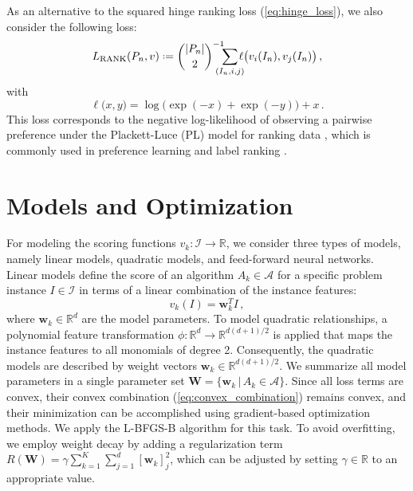 \documentclass[runningheads]{llncs}
\newcommand*{\defeq}{\mathrel{\vcenter{\baselineskip0.5ex \lineskiplimit0pt
			\hbox{\footnotesize.}\hbox{\footnotesize.}}}%
	=}
\begin{document}
As an alternative to the squared hinge ranking loss (\ref{eq:hinge_loss}), we also consider the following loss:
\begin{equation}
\label{eq:pl_nll}
L_\text{RANK}(P_n,v) \defeq   \binom{|P_n|}{2}^{-1} \!\!\!\!\!\! %
\sum_{(I_n, i , j)} \!\!\!\! 
\ell \big( v_i(I_n) , v_j(I_n) \big) \, ,
\end{equation}
with 
\begin{equation}
\ell \big( x, y \big) = 
\log \big( \exp(- x ) +  \exp( - y ) \big) + x \, .
\end{equation}
This loss corresponds to the negative log-likelihood of observing a pairwise preference under the Plackett-Luce (PL) model for ranking data \cite{plackett_analysis_1975,luce_individual_1959}, which is commonly used in preference learning and label ranking \cite{cheng_label_2010}. 




\section{Models and Optimization}
\label{sec:models_optimization}
For modeling the scoring functions $v_k \colon \mathcal{I} \to \mathbb{R}$, we consider three types of models, namely linear models, quadratic models, and feed-forward neural networks. Linear models define the score of an algorithm $A_k \in \mathcal{A}$ for a specific problem instance $I \in \mathcal{I}$ in terms of a linear combination of the instance features:
\begin{equation}\label{eq:linear_model}
    v_k(I) = \boldsymbol{w}_k^T I \, ,
\end{equation}
where $\boldsymbol{w}_k \in \mathbb{R}^d$ are the model parameters. To model quadratic relationships, a polynomial feature transformation $\phi \colon \mathbb{R}^d \to \mathbb{R}^{d(d+1)/2}$ is applied that maps the instance features to all monomials of degree 2. Consequently, the quadratic models are described by weight vectors $\boldsymbol{w}_k \in \mathbb{R}^{d(d+1)/2}$. We summarize all  model parameters in a single parameter set $\boldsymbol{W} = \{\boldsymbol{w}_k  \,| \, A_k \in \mathcal{A} \}$. Since all loss terms are convex, their convex combination (\ref{eq:convex_combination}) remains convex, and their minimization can be accomplished using gradient-based optimization methods. We apply the L-BFGS-B algorithm \cite{byrd_limited_1995,zhu_algorithm_1997} for this task. To avoid overfitting, we employ weight decay by adding a regularization term $R(\boldsymbol{W}) = \gamma \sum_{k=1}^{K} \sum_{j=1}^{d} [\boldsymbol{w}_k]_j^2$, which can be adjusted by setting $\gamma \in \mathbb{R}$ to an appropriate value.
\end{document}
